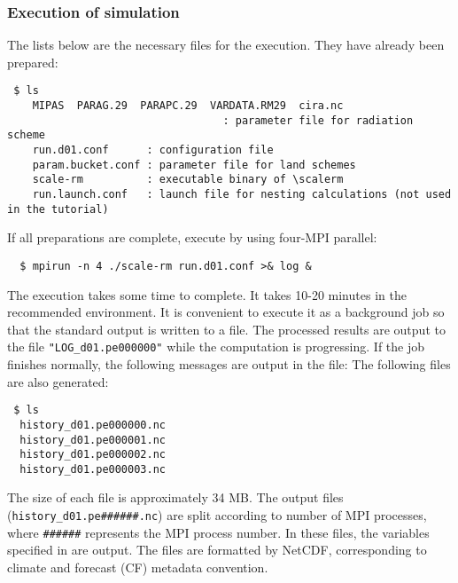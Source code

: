 \subsubsection{Execution of simulation}

The lists below are the necessary files for the execution. They have already been prepared:
\begin{verbatim}
 $ ls
    MIPAS  PARAG.29  PARAPC.29  VARDATA.RM29  cira.nc
                                  : parameter file for radiation scheme
    run.d01.conf      : configuration file
    param.bucket.conf : parameter file for land schemes
    scale-rm          : executable binary of \scalerm
    run.launch.conf   : launch file for nesting calculations (not used in the tutorial)
\end{verbatim}
If all preparations are complete, execute \scalerm by using four-MPI parallel:
\begin{verbatim}
  $ mpirun -n 4 ./scale-rm run.d01.conf >& log &
\end{verbatim}
The execution takes some time to complete. It takes 10-20 minutes in the recommended environment. It is convenient to execute it as a background job  so that the standard output is written to a file. The processed results are output to the file \verb|"LOG_d01.pe000000"| while the computation is progressing.  If the job finishes normally, the following messages are output in the file:
The following files are also generated:
\begin{verbatim}
 $ ls
  history_d01.pe000000.nc
  history_d01.pe000001.nc
  history_d01.pe000002.nc
  history_d01.pe000003.nc
\end{verbatim}
The size of each file is approximately 34 MB.
The output files (\verb|history_d01.pe######.nc|) are
split according to number of MPI processes,
where \verb|######| represents the MPI process number.
In these files, the variables specified in  are output.
The files are formatted by NetCDF,
corresponding to climate and forecast (CF) metadata convention.





